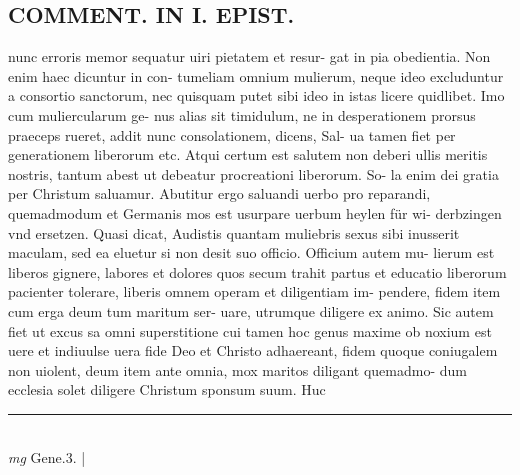 \documentclass{article}
\begin{document}
\begin{pages}
\section*{COMMENT. IN I. EPIST. }\pstart nunc erroris memor sequatur uiri pietatem et resur- gat in pia obedientia. Non enim haec dicuntur in con- tumeliam omnium mulierum, neque ideo excluduntur a consortio sanctorum, nec quisquam putet sibi ideo in istas licere quidlibet. Imo cum muliercularum ge- nus alias sit timidulum, ne in desperationem prorsus praeceps rueret, addit nunc consolationem, dicens, Sal- ua tamen fiet per generationem liberorum etc. Atqui certum est salutem non deberi ullis meritis nostris, tantum abest ut debeatur procreationi liberorum. So- la enim dei gratia per Christum saluamur. Abutitur ergo saluandi uerbo pro reparandi, quemadmodum et Germanis mos est usurpare uerbum heylen für wi- derbzingen vnd ersetzen. Quasi dicat, Audistis quantam muliebris sexus sibi inusserit maculam, sed ea eluetur si non desit suo officio. Officium autem mu- lierum est liberos gignere, labores et dolores quos secum trahit partus et educatio liberorum pacienter tolerare, liberis omnem operam et diligentiam im- pendere, fidem item cum erga deum tum maritum ser- uare, utrumque diligere ex animo. Sic autem fiet ut excus sa omni superstitione cui tamen hoc genus maxime ob noxium est uere et indiuulse uera fide Deo et Christo adhaereant, fidem quoque coniugalem non uiolent, deum item ante omnia, mox maritos diligant quemadmo- dum ecclesia solet diligere Christum sponsum suum. Huc  \pend
\vspace{0.5cm}\noindent
\vspace{0.2cm}\rule{1cm}{0.2pt}\\ 
\hspace{0.2cm}\textit{mg}
\footnotesize Gene.3. 
\normalsize| 

\end{pages}
\end{document}
